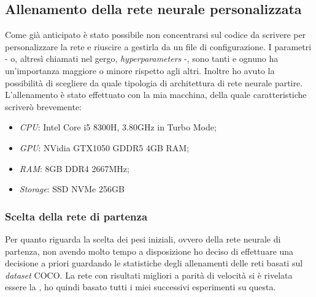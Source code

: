     \subsection{Allenamento della rete neurale personalizzata}
    Come già anticipato è stato possibile non concentrarsi sul codice da scrivere per personalizzare la rete e riuscire a gestirla da un file di configurazione. I parametri - o, altresì chiamati nel gergo, \textit{hyperparameters} -, sono tanti e ognuno ha un'importanza maggiore o minore rispetto agli altri. Inoltre ho avuto la possibilità di scegliere da quale tipologia di architettura di rete neurale partire.
    \medskip
    \\L'allenamento è stato effettuato con la mia macchina, della quale caratteristiche scriverò brevemente:
    \begin{itemize}
        \item \textit{CPU}: Intel Core i5 8300H, 3.80GHz in Turbo Mode;
        \item \textit{GPU}: NVidia GTX1050 GDDR5 4GB RAM;
        \item \textit{RAM}: 8GB DDR4 2667MHz;
        \item \textit{Storage}: SSD NVMe 256GB
    \end{itemize}
        \subsubsection{Scelta della rete di partenza}
        Per quanto riguarda la scelta dei pesi iniziali, ovvero della rete neurale di partenza, non avendo molto tempo a disposizione ho deciso di effettuare una decisione a priori guardando le statistiche\cite{site:COCO-trained-model-statistics} degli allenamenti delle reti basati sul \textit{dataset} COCO\cite{site:coco-dataset}. La rete con risultati migliori a parità di velocità si è rivelata essere la , ho quindi basato tutti i miei successivi esperimenti su questa.
